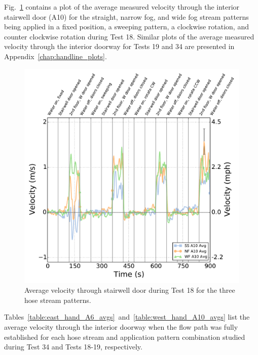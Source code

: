 \documentclass[12pt,oneside]{book}
\begin{document}
Fig.~\ref{fig:Test_18_BDP_A10_Avg_All} contains a plot of the average measured velocity through the interior stairwell door (A10) for the straight, narrow fog, and wide fog stream patterns being applied in a fixed position, a sweeping pattern, a clockwise rotation, and counter clockwise rotation during Test 18. Similar plots of the average measured velocity through the interior doorway for Tests 19 and 34 are presented in Appendix~\ref{chap:handline_plots}.

\begin{figure}[!ht]
	\includegraphics[width=\columnwidth]{../Figures/Plots/Test_18_West_063014_BDP_A10_stream_avgs}
	\caption{Average velocity through stairwell door during Test 18 for the three hose stream patterns.}
	\label{fig:Test_18_BDP_A10_Avg_All}
\end{figure}
\FloatBarrier

Tables~\ref{table:east_hand_A6_avgs}~and~\ref{table:west_hand_A10_avgs} list the average velocity through the interior doorway when the flow path was fully established for each hose stream and application pattern combination studied during Test 34 and Tests 18-19, respectively.

\end{document}
